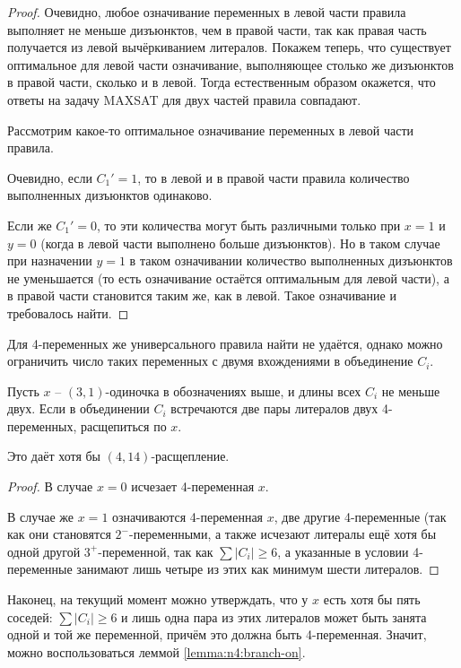 \begin{proof}
 Очевидно, любое означивание переменных в левой части правила выполняет не меньше дизъюнктов, чем в правой части, так как правая часть получается из левой вычёркиванием литералов.
 Покажем теперь, что существует оптимальное для левой части означивание, выполняющее столько же дизъюнктов в правой части, сколько и в левой. Тогда естественным образом окажется, что ответы на задачу MAXSAT для двух частей правила совпадают.

 Рассмотрим какое-то оптимальное означивание переменных в левой части правила.

 Очевидно, если $C_1' = 1$, то в левой и в правой части правила количество выполненных дизъюнктов одинаково.

 Если же $C_1' = 0$, то эти количества могут быть различными только при $x = 1$ и $y = 0$ (когда в левой части выполнено больше дизъюнктов). Но в таком случае при назначении $y = 1$ в таком означивании количество выполненных дизъюнктов не уменьшается (то есть означивание остаётся оптимальным для левой части), а в правой части становится таким же, как в левой.
 Такое означивание и требовалось найти.
\end{proof}

Для 4-переменных же универсального правила найти не удаётся, однако можно ограничить число таких переменных с двумя вхождениями в объединение $C_i$.

\begin{brule}
 Пусть $x$ -- $(3,1)$-одиночка в обозначениях выше, и длины всех $C_i$ не меньше двух. Если в объединении $C_i$ встречаются две пары литералов двух 4-переменных, расщепиться по $x$.

 Это даёт хотя бы $(4,14)$-расщепление.
 \label{brule:n4:31:4v-2}
\end{brule}

\begin{proof}
 В случае $x = 0$ исчезает 4-переменная $x$.

 В случае же $x = 1$ означиваются 4-переменная $x$, две другие 4-переменные (так как они становятся $2^-$-переменными, а также исчезают литералы ещё хотя бы одной другой $3^+$-переменной, так как $\sum |C_i| \geq 6$, а указанные в условии 4-переменные занимают лишь четыре из этих как минимум шести литералов.
\end{proof}

Наконец, на текущий момент можно утверждать, что у $x$ есть хотя бы пять соседей: $\sum |C_i| \geq 6$ и лишь одна пара из этих литералов может быть занята одной и той же переменной, причём это должна быть 4-переменная.
Значит, можно воспользоваться леммой \ref{lemma:n4:branch-on}.

